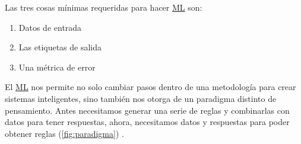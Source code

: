 Las tres cosas mínimas requeridas para hacer \hyperlink{abbr}{ML} son:

\begin{enumerate}
    \item{Datos de entrada}
    \item{Las etiquetas de salida}
    \item{Una métrica de error} 
\end{enumerate}

El \hyperlink{abbr}{ML} nos permite no solo cambiar pasos dentro de una
metodología para crear sistemas inteligentes, sino también nos otorga de un
paradigma distinto de pensamiento. Antes necesitamos generar una serie de reglas
y combinarlas con datos para tener respuestas, ahora, necesitamos datos y
respuestas para poder obtener reglas (\autoref{fig:paradigma})
\cite{Chollet2018}.


